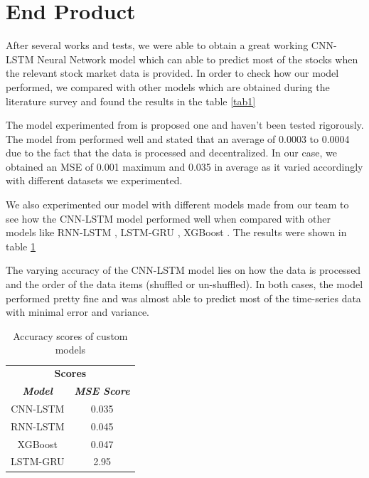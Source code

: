 \documentclass[conference]{IEEEtran}
\begin{document}
\FloatBarrier
\section{End Product}

After several works and tests, we were able to obtain a great working CNN-LSTM Neural Network model which can able to predict most of the stocks when the relevant stock market data is provided. In order to check how our model performed, we compared with other models which are obtained during the literature survey and found the results in the table \ref{tab1}

The model experimented from \cite{b3} is proposed one and haven't been tested rigorously. The model from \cite{b9} performed well and stated that an average of 0.0003 to 0.0004 due to the fact that the data is processed and decentralized. In our case, we obtained an MSE of 0.001 maximum and 0.035 in average as it varied accordingly with different datasets we experimented.

We also experimented our model with different models made from our team to see how the CNN-LSTM model performed well when compared with other models like RNN-LSTM \cite{b25}, LSTM-GRU \cite{b26}, XGBoost \cite{b27}. The results were shown in table \ref{tab2}

The varying accuracy of the CNN-LSTM model lies on how the data is processed and the order of the data items (shuffled or un-shuffled). In both cases, the model performed pretty fine and was almost able to predict most of the time-series data with minimal error and variance.

\begin{table}[htbp]
	\caption{Accuracy scores of custom models}
	\begin{center}
		\begin{tabular}{|c|c|}
			\hline
			\multicolumn{2}{|c|}{\textbf{Scores}} \\
			\cline{1-2} 
			\textbf{\textit{Model}}& \textbf{\textit{MSE Score}} \\
			\hline
			CNN-LSTM & 0.035 \\
			\hline
			RNN-LSTM \cite{b25} & 0.045 \\
			\hline
			XGBoost \cite{b27} & 0.047 \\
			\hline
			LSTM-GRU \cite{b26} & 2.95 \\
			\hline
		\end{tabular}
		\label{tab2}
	\end{center}
\end{table}
\end{document}
